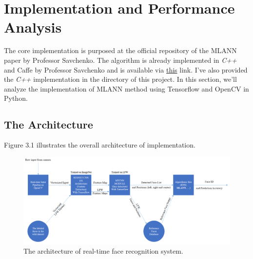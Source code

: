 \chapter{Implementation and Performance Analysis}

The core implementation is purposed at the official repository of the MLANN paper by Professor Savchenko. The algorithm is already implemented in \textit{C++} and Caffe by Professor Savchenko and is available via \href{https://github.com/HSE-asavchenko/HSE_FaceRec/tree/master/src}{this} link. I've also provided the \textit{C++} implementation in the directory of this project. In this section, we'll analyze the implementation of MLANN method using Tensorflow and OpenCV in Python.

\section{The Architecture}
Figure 3.1 illustrates the overall architecture of implementation.
\begin{figure}[!h]\centering
	\includegraphics[width=1.1\textwidth]{diagram.PNG}
	\caption{The architecture of real-time face recognition system.}
	\label{pl1}
\end{figure}